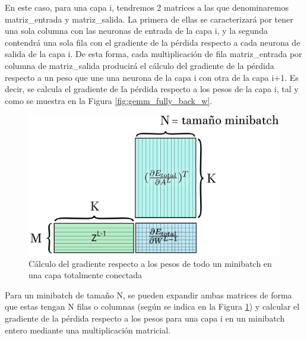 En este caso, para una capa i, tendremos 2 matrices a las que denominaremos matriz\_entrada y matriz\_salida. La primera de ellas se caracterizará por tener una sola columna con las neuronas de entrada de la capa i, y la segunda contendrá una sola fila con el gradiente de la pérdida respecto a cada neurona de salida de la capa i. De esta forma, cada multiplicación de fila matriz\_entrada por columna de matriz\_salida producirá el cálculo del gradiente de la pérdida respecto a un peso que une una neurona de la capa i con otra de la capa i+1. Es decir, se calcula el gradiente de la pérdida respecto a los pesos de la capa i, tal y como se muestra en la Figura \ref{fig:gemm_fully_back_w}.

\begin{figure}[H]
	\centering
	\includegraphics[scale=0.25]{imagenes/gemm_fully_back_w_minibatch.jpg}  
	\caption{Cálculo del gradiente respecto a los pesos de todo un minibatch en una capa totalmente conectada}
	\label{fig:gemm_fully_back_w_minibatch}
\end{figure}

Para un minibatch de tamaño N, se pueden expandir ambas matrices de forma que estas tengan N filas o columnas (según se indica en la Figura \ref{fig:gemm_fully_back_w_minibatch}) y calcular el gradiente de la pérdida respecto a los pesos para una capa i en un minibatch entero mediante una multiplicación matricial.

